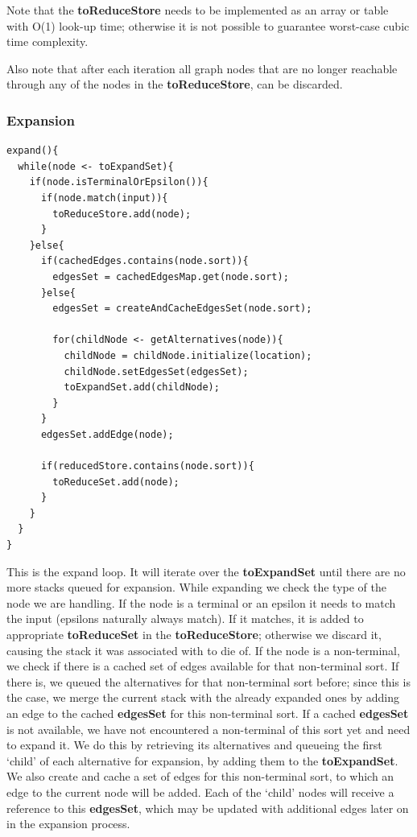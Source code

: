 \documentclass[a4paper,10pt]{article}
\begin{document}
Note that the {\bf toReduceStore} needs to be implemented as an array or table with O(1) look-up time; otherwise it is not possible to guarantee worst-case cubic time complexity.

Also note that after each iteration all graph nodes that are no longer reachable through any of the nodes in the {\bf toReduceStore}, can be discarded.

\pagebreak
\subsubsection{Expansion}
\label{subsec:pseudocodeExpand}
{\small
\begin{verbatim}
expand(){
  while(node <- toExpandSet){
    if(node.isTerminalOrEpsilon()){
      if(node.match(input)){
        toReduceStore.add(node);
      }
    }else{
      if(cachedEdges.contains(node.sort)){
        edgesSet = cachedEdgesMap.get(node.sort);
      }else{
        edgesSet = createAndCacheEdgesSet(node.sort);
        
        for(childNode <- getAlternatives(node)){
          childNode = childNode.initialize(location);
          childNode.setEdgesSet(edgesSet);
          toExpandSet.add(childNode);
        }
      }
      edgesSet.addEdge(node);
      
      if(reducedStore.contains(node.sort)){
        toReduceSet.add(node);
      }
    }
  }
}
\end{verbatim}
}

This is the expand loop. It will iterate over the {\bf toExpandSet} until there are no more stacks queued for expansion. While expanding we check the type of the node we are handling. If the node is a terminal or an epsilon it needs to match the input (epsilons naturally always match). If it matches, it is added to appropriate {\bf toReduceSet} in the {\bf toReduceStore}; otherwise we discard it, causing the stack it was associated with to die of. If the node is a non-terminal, we check if there is a cached set of edges available for that non-terminal sort. If there is, we queued the alternatives for that non-terminal sort before; since this is the case, we merge the current stack with the already expanded ones by adding an edge to the cached {\bf edgesSet} for this non-terminal sort. If a cached {\bf edgesSet} is not available, we have not encountered a non-terminal of this sort yet and need to expand it. We do this by retrieving its alternatives and queueing the first `child' of each alternative for expansion, by adding them to the {\bf toExpandSet}. We also create and cache a set of edges for this non-terminal sort, to which an edge to the current node will be added. Each of the `child' nodes will receive a reference to this {\bf edgesSet}, which may be updated with additional edges later on in the expansion process.
\end{document}
